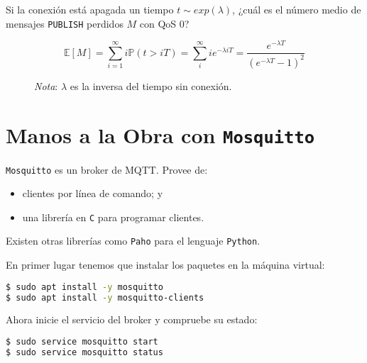 \documentclass[xcolor={x11names}]{beamer}
\begin{document}
\begin{frame}{\secname}
    Si la conexión está apagada un tiempo
    $t\sim exp(\lambda)$, ¿cuál es el
    número medio de mensajes \texttt{PUBLISH}
    perdidos $M$ con QoS 0?

    \begin{equation}
        \mathbb{E}[M]=\sum_{i=1}^\infty i \mathbb{P}(t>iT)
        =\sum_i^{\infty} i e^{-\lambda iT}
        =\frac{e^{-\lambda T}}{(e^{-\lambda T}-1)^2}
    \end{equation}


    \begin{figure}

\emph{Nota}: $\lambda$ es la inversa del tiempo sin conexión.
\end{figure}


\end{frame}





\section{Manos a la Obra con \texttt{Mosquitto}}
\begin{frame}{\secname}
    \texttt{Mosquitto} es un broker de MQTT. Provee de:
    \begin{itemize}
        \item clientes por línea de comando; y
        \item una librería en \texttt{C} para
            programar clientes.
    \end{itemize}
    Existen otras librerías como \texttt{Paho}
    para el lenguaje \texttt{Python}.
\end{frame}



\begin{frame}[fragile]{\secname}
    En primer lugar tenemos que instalar
    los paquetes en la máquina virtual:
\begin{lstlisting}[language=bash]
$ sudo apt install -y mosquitto
$ sudo apt install -y mosquitto-clients
\end{lstlisting}

    Ahora inicie el servicio 
    del broker y compruebe su estado:
\begin{lstlisting}[language=bash]
$ sudo service mosquitto start 
$ sudo service mosquitto status 
\end{lstlisting}
\end{frame}
\end{document}
